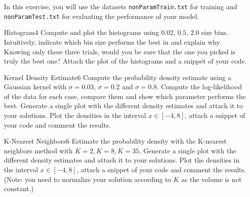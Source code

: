 \newif\ifvimbug
\vimbugfalse

\ifvimbug

\fi

 
In this exercise, you will use the datasets \texttt{nonParamTrain.txt} for training and \texttt{nonParamTest.txt} for evaluating the performance of your model.

\begin{questions}


\begin{question}{Histogram}{4}
Compute and plot the histograms using $0.02$, $0.5$, $2.0$ size bins.  
Intuitively, indicate which bin size performs the best in and explain why. Knowing only these three trials, would you be sure that the one you picked is truly the best one? Attach the plot of the histograms and a snippet of your code.


\begin{answer}
\end{answer}

\end{question}


\begin{question}{Kernel Density Estimate}{6}
Compute the probability density estimate using a Gaussian kernel with $\sigma=0.03$, $\sigma=0.2$ and $\sigma=0.8$. Compute the log-likelihood of the data for each case, compare them and show which parameter performs the best.
Generate a single plot with the different density estimates and attach it to your solutions. Plot the densities in the interval $x \in [-4,8]$, attach a snippet of your code and comment the results.

\begin{answer}
\end{answer}

\end{question}


\begin{question}{K-Nearest Neighbors}{6}
Estimate the probability density with the K-nearest neighbors method with $K=2, K=8, K=35$.
Generate a single plot with the different density estimates and attach it to your solutions. Plot the densities in the interval $x \in [-4,8]$, attach a snippet of your code and comment the results.
(Note: you need to normalize your solution according to $K$ as the volume is not constant.)



\end{question}
\end{questions}
